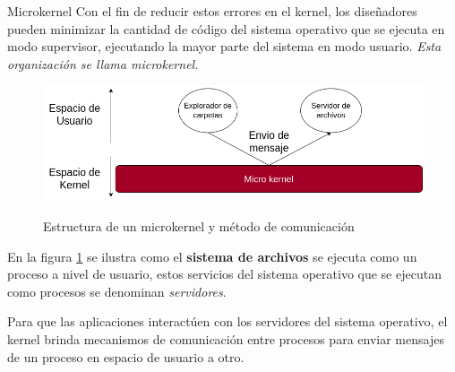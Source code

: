 \documentclass{libs/ufc_format}
\begin{document}
\begin{frame}{Microkernel}
  Con el fin de reducir estos errores en el kernel, los diseñadores pueden minimizar la cantidad de código del sistema operativo que se ejecuta en modo supervisor, ejecutando la mayor parte del sistema en modo usuario. \emph{Esta organización se llama microkernel.} \newline

  \begin{figure}
    \centering
    \caption{Estructura de un microkernel y método de comunicación}
    \includegraphics[scale=0.3]{libs/img/Estructura_microkernel.png}
    \label{fig:Estructura Micro-Kernel}
  \end{figure}
\end{frame}
\begin{frame}
  En la figura \ref{fig:Estructura Micro-Kernel} se ilustra como el \textbf{sistema de archivos} se ejecuta como un proceso a nivel de usuario, estos servicios del sistema operativo que se ejecutan como procesos se denominan \emph{servidores}.

  \vspace{0.2cm}

  Para que las aplicaciones interactúen con los servidores del sistema operativo, el kernel brinda mecanismos de comunicación entre procesos para enviar mensajes de un proceso en espacio de usuario a otro. \newline
\end{frame}
\end{document}
